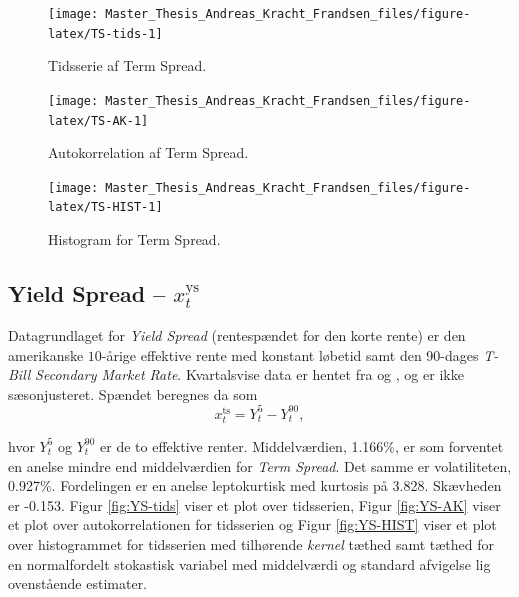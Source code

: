 \documentclass[
  a4paper,
  oneside]{memoir}
\begin{document}
\begin{figure}[H]

{\centering \texttt{[image: Master\_Thesis\_Andreas\_Kracht\_Frandsen\_files/figure-latex/TS-tids-1]} 

}

\caption{Tidsserie af Term Spread.}\label{fig:TS-tids}
\end{figure}

\begin{figure}[H]

{\centering \texttt{[image: Master\_Thesis\_Andreas\_Kracht\_Frandsen\_files/figure-latex/TS-AK-1]} 

}

\caption{Autokorrelation af Term Spread.}\label{fig:TS-AK}
\end{figure}

\begin{figure}[H]

{\centering \texttt{[image: Master\_Thesis\_Andreas\_Kracht\_Frandsen\_files/figure-latex/TS-HIST-1]} 

}

\caption{Histogram for Term Spread.}\label{fig:TS-HIST}
\end{figure}

\hypertarget{yield-spread-x_ttextys}{%
\subsection{\texorpdfstring{Yield Spread -- \(x_t^{\text{ys}}\)}{Yield Spread -- x\_t\^{}\{\textbackslash text\{ys\}\}}}\label{yield-spread-x_ttextys}}

Datagrundlaget for \emph{Yield Spread} (rentespændet for den korte rente) er den amerikanske \(10\)-årige effektive rente med konstant løbetid samt den 90-dages \emph{T-Bill} \emph{Secondary Market Rate}. Kvartalsvise data er hentet fra \citep{FRED52020} og \citep{FRED902020}, og er ikke sæsonjusteret. Spændet beregnes da som
\[x_t^{\text{ts}}=Y_t^{5}-Y_t^{90},\]

hvor \(Y_t^{5}\) og \(Y_t^{90}\) er de to effektive renter. Middelværdien, 1.166\(\%\), er som forventet en anelse mindre end middelværdien for \emph{Term Spread}. Det samme er volatiliteten, 0.927\(\%\). Fordelingen er en anelse leptokurtisk med kurtosis på 3.828. Skævheden er -0.153. Figur \ref{fig:YS-tids} viser et plot over tidsserien, Figur \ref{fig:YS-AK} viser et plot over autokorrelationen for tidsserien og Figur \ref{fig:YS-HIST} viser et plot over histogrammet for tidsserien med tilhørende \emph{kernel} tæthed samt tæthed for en normalfordelt stokastisk variabel med middelværdi og standard afvigelse lig ovenstående estimater.
\end{document}
